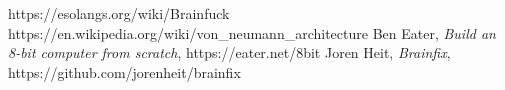 \begin{thebibliography}{99}
 https://esolangs.org/wiki/Brainfuck
 https://en.wikipedia.org/wiki/von\_neumann\_architecture
 Ben Eater, \emph{Build an 8-bit computer from scratch}, https://eater.net/8bit
 Joren Heit, \emph{Brainfix}, https://github.com/jorenheit/brainfix
\end{thebibliography}
